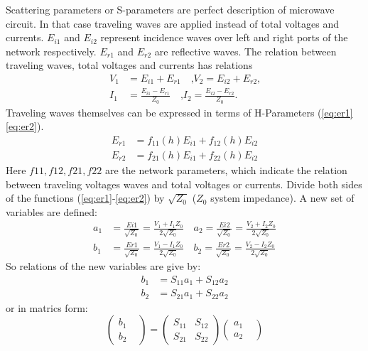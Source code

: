 Scattering parameters or S-parameters are perfect description of microwave circuit\cite{RF194_s_parameters}. In that case traveling waves are applied instead of total voltages and currents. $E_{i1}$ and $E_{i2}$ represent incidence waves over left and right ports of the network respectively. $E_{r1}$ and $E_{r2}$ are reflective waves. The relation between traveling waves, total voltages and currents has relations %
\begin{align}
V_{1}&=E_{i1}+E_{r1}\quad\text{,} V_{2}=E_{i2}+E_{r2}\text{,}
\label{eq:voltage_wave1}\\
I_{1}&=\frac{E_{i1}-E_{r1}}{Z_{0}}\quad\text{,} I_{2}=\frac{E_{i2}-E_{r2}}{Z_{0}}\text{.}
\label{eq:voltage_wave2}
\end{align}
Traveling waves themselves can be expressed in terms of H-Parameters (\ref{eq:er1}\ref{eq:er2}). 
\begin{align}
E_{r1}&=f_{11}(h)E_{i1}+f_{12}(h)E_{i2}
\label{eq:er1}
\\
E_{r2}&=f_{21}(h)E_{i1}+f_{22}(h)E_{i2}
\label{eq:er2}
\end{align}
Here $f11, f12, f21, f22$ are the network parameters, which indicate the relation between traveling voltages waves and total voltages or currents. Divide both sides of the functions (\ref{eq:er1}-\ref{eq:er2}) by $\sqrt{Z_{0}}$ ($Z_{0}$ system impedance). A new set of variables are defined:
\begin{align} 
a_{1}&=\frac{Ei1}{\sqrt{Z_{0}}}=\frac{V_{1}+I_{1}Z_{0}}{2\sqrt{Z_{0}}} \quad a_{2}=\frac{Ei2}{\sqrt{Z_{0}}}=\frac{V_{2}+I_{2}Z_{0}}{2\sqrt{Z_{0}}} \\
b_{1}&=\frac{Er1}{\sqrt{Z_{0}}}=\frac{V_{1}-I_{1}Z_{0}}{2\sqrt{Z_{0}}}  \quad b_{2}=\frac{Er2}{\sqrt{Z_{0}}}=\frac{V_{2}-I_{2}Z_{0}}{2\sqrt{Z_{0}}}
\end{align}
So relations of the new variables are give by:
\begin{align}
b_{1}&=S_{11}a_{1}+S_{12}a_{2}\\
b_{2}&=S_{21}a_{1}+S_{22}a_{2}
\end{align}
or in matrics form:
\begin{equation}
		\begin{pmatrix}
			b_{1}&\\
			b_{2}&
		\end{pmatrix}
	=	
		\begin{pmatrix}
			S_{11}&S_{12}\\
			S_{21}&S_{22}
		\end{pmatrix}
		\begin{pmatrix}
			a_{1}&\\
			a_{2}&
		\end{pmatrix}
\label{eq:s_matrix}
\end{equation}

